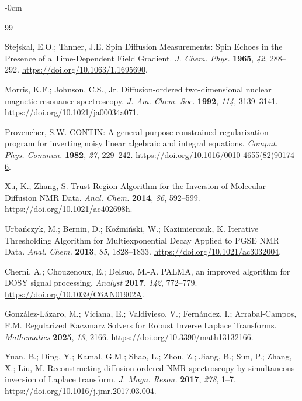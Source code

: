 \documentclass[mathematics,article,accept,moreauthors]{Definitions/mdpi}
\begin{document}
\begin{adjustwidth}{-\extralength}{0cm}


\begin{thebibliography}{99}
%

Stejskal, E.O.; Tanner, J.E. Spin Diffusion Measurements: Spin Echoes in the Presence of a Time-Dependent Field Gradient. \emph{J. Chem. Phys.} \textbf{1965}, \emph{42}, 288--292. \url{https://doi.org/10.1063/1.1695690}.

Morris, K.F.; Johnson, C.S., Jr. Diffusion-ordered two-dimensional nuclear magnetic resonance spectroscopy. \emph{J. Am. Chem. Soc.} \textbf{1992}, \emph{114}, 3139--3141. \url{https://doi.org/10.1021/ja00034a071}.

Provencher, S.W. CONTIN: A general purpose constrained regularization program for inverting noisy linear algebraic and integral equations. \emph{Comput. Phys. Commun.} \textbf{1982}, \emph{27}, 229--242. \url{https://doi.org/10.1016/0010-4655(82)90174-6}.

Xu, K.; Zhang, S. Trust-Region Algorithm for the Inversion of Molecular Diffusion NMR Data. \emph{Anal. Chem.} \textbf{2014}, \emph{86}, 592--599. \url{https://doi.org/10.1021/ac402698h}.

Urba\'nczyk, M.; Bernin, D.; Ko\'zmi\'nski, W.; Kazimierczuk, K. Iterative Thresholding Algorithm for Multiexponential Decay Applied to PGSE NMR Data. \emph{Anal. Chem.} \textbf{2013}, \emph{85}, 1828--1833. \url{https://doi.org/10.1021/ac3032004}.

Cherni, A.; Chouzenoux, E.; Delsuc, M.-A. PALMA, an improved algorithm for DOSY signal processing. \emph{Analyst} \textbf{2017}, \emph{142}, 772--779. \url{https://doi.org/10.1039/C6AN01902A}.

Gonz\'alez-L\'azaro, M.; Viciana, E.; Valdivieso, V.; Fern\'andez, I.; Arrabal-Campos, F.M. Regularized Kaczmarz Solvers for Robust Inverse Laplace Transforms. \emph{Mathematics} \textbf{2025}, \emph{13}, 2166. \url{https://doi.org/10.3390/math13132166}.

Yuan, B.; Ding, Y.; Kamal, G.M.; Shao, L.; Zhou, Z.; Jiang, B.; Sun, P.; Zhang, X.; Liu, M. Reconstructing diffusion ordered NMR spectroscopy by simultaneous inversion of Laplace transform. \emph{J. Magn. Reson.} \textbf{2017}, \emph{278}, 1--7. \url{https://doi.org/10.1016/j.jmr.2017.03.004}.


\end{thebibliography}
\end{adjustwidth}
\end{document}
